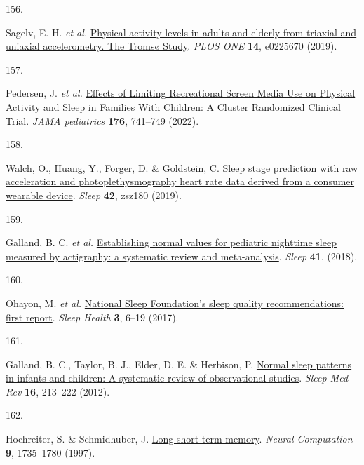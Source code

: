 \documentclass[
  10pt,
]{scrbook}
\newlength{\cslhangindent}
\newlength{\csllabelwidth}
\newlength{\cslentryspacingunit} %
\newenvironment{CSLReferences}[2] %
 {%
  \setlength{\parindent}{0pt}
  \ifodd #1
  \let\oldpar\par
  \def\par{\hangindent=\cslhangindent\oldpar}
  \fi
  \setlength{\parskip}{#2\cslentryspacingunit}
 }%
 {}
\newcommand{\CSLLeftMargin}[1]{\parbox[t]{\csllabelwidth}{#1}}
\newcommand{\CSLRightInline}[1]{\parbox[t]{\linewidth - \csllabelwidth}{#1}\break}
\let\originaltextbf\textbf
\renewcommand{\textbf}[1]{\textcolor{color1}{\textsf{\originaltextbf{#1}}}}
\begin{document}
\begin{CSLReferences}{0}{0}
\leavevmode{}%
\CSLLeftMargin{156. }%
\CSLRightInline{Sagelv, E. H. \emph{et al.}
\href{https://doi.org/10.1371/journal.pone.0225670}{Physical activity
levels in adults and elderly from triaxial and uniaxial accelerometry.
The Tromsø Study}. \emph{PLOS ONE} \textbf{14}, e0225670 (2019).}

\leavevmode{}%
\CSLLeftMargin{157. }%
\CSLRightInline{Pedersen, J. \emph{et al.}
\href{https://doi.org/10.1001/jamapediatrics.2022.1519}{Effects of
Limiting Recreational Screen Media Use on Physical Activity and Sleep in
Families With Children: A Cluster Randomized Clinical Trial}. \emph{JAMA
pediatrics} \textbf{176}, 741--749 (2022).}

\leavevmode{}%
\CSLLeftMargin{158. }%
\CSLRightInline{Walch, O., Huang, Y., Forger, D. \& Goldstein, C.
\href{https://doi.org/10.1093/sleep/zsz180}{Sleep stage prediction with
raw acceleration and photoplethysmography heart rate data derived from a
consumer wearable device}. \emph{Sleep} \textbf{42}, zsz180 (2019).}

\leavevmode{}%
\CSLLeftMargin{159. }%
\CSLRightInline{Galland, B. C. \emph{et al.}
\href{https://doi.org/10.1093/sleep/zsy017}{Establishing normal values
for pediatric nighttime sleep measured by actigraphy: a systematic
review and meta-analysis}. \emph{Sleep} \textbf{41}, (2018).}

\leavevmode{}%
\CSLLeftMargin{160. }%
\CSLRightInline{Ohayon, M. \emph{et al.}
\href{https://doi.org/10.1016/j.sleh.2016.11.006}{National Sleep
Foundation's sleep quality recommendations: first report}. \emph{Sleep
Health} \textbf{3}, 6--19 (2017).}

\leavevmode{}%
\CSLLeftMargin{161. }%
\CSLRightInline{Galland, B. C., Taylor, B. J., Elder, D. E. \& Herbison,
P. \href{https://doi.org/10.1016/j.smrv.2011.06.001}{Normal sleep
patterns in infants and children: A systematic review of observational
studies}. \emph{Sleep Med Rev} \textbf{16}, 213--222 (2012).}

\leavevmode{}%
\CSLLeftMargin{162. }%
\CSLRightInline{Hochreiter, S. \& Schmidhuber, J.
\href{https://doi.org/10.1162/neco.1997.9.8.1735}{Long short-term
memory}. \emph{Neural Computation} \textbf{9}, 1735--1780 (1997).}


\end{CSLReferences}
\end{document}
